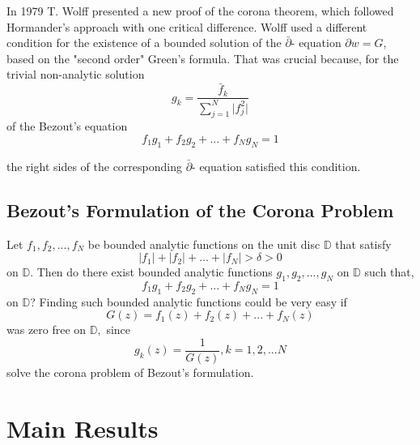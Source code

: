 \documentclass[reqno, 12pt]{amsart}
\theoremstyle{definition}
\theoremstyle{definition}
\begin{document}
 In 1979 T. Wolff presented a new proof of the corona theorem, which followed Hormander's approach with one critical difference. Wolff used a different condition for the existence of a bounded solution of the $\bar{\partial}$- equation $\partial w = G$, based on the "second order" Green's formula. That was crucial because, for the trivial non-analytic solution $$g_k =\frac{\bar f_k}{\sum_{j=1}^N \lvert f_j^2 \rvert}$$ of the Bezout's equation $$f_1g_1+f_2g_2+...+f_Ng_N=1$$

the right sides of the corresponding $\bar{\partial}$- equation satisfied this condition.


 \subsection*{Bezout's Formulation of the Corona Problem}
Let $f_1, f_2,...,f_N$ be bounded analytic functions on the unit disc $\mathbb{D}$ that satisfy $$\lvert f_1 \rvert+ \lvert f_2 \rvert +...+ \lvert f_N \rvert > \delta > 0$$ on $\mathbb{D}.$ Then do there exist bounded analytic functions $g_1, g_2, ..., g_N $ on $\mathbb{D}$ such that, $$f_1g_1+f_2g_2+...+f_Ng_N=1$$ on $\mathbb{D}$? Finding such bounded analytic functions could be very easy if $$G(z)=f_1(z)+f_2(z)+...+f_N(z)$$ was zero free on $\mathbb{D},$ since $$g_k(z)=\frac{1}{G(z)}, k= 1, 2, ...N$$ solve the corona problem of Bezout's formulation.  




\section{Main Results}
\end{document}

